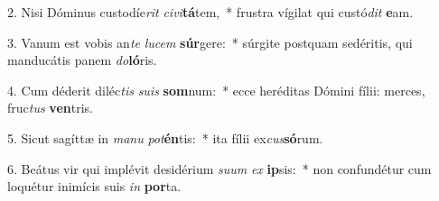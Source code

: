 2. Nisi Dóminus custodíe\textit{rit} \textit{ci}\textit{vi}\textbf{tá}tem,~*  frustra vígilat qui custó\textit{dit} \textbf{e}am.\

3. Vanum est vobis an\textit{te} \textit{lu}\textit{cem} \textbf{súr}gere:~*  súrgite postquam sedéritis, qui manducátis panem \textit{do}\textbf{ló}ris.\

4. Cum déderit diléc\textit{tis} \textit{su}\textit{is} \textbf{som}num:~*  ecce heréditas Dómini fílii: merces, fruc\textit{tus} \textbf{ven}tris.\

5. Sicut sagíttæ in \textit{ma}\textit{nu} \textit{pot}\textbf{én}tis:~*  ita fílii ex\textit{cus}\textbf{só}rum.\

6. Beátus vir qui implévit desidérium \textit{su}\textit{um} \textit{ex} \textbf{ip}sis:~*  non confundétur cum loquétur inimícis suis \textit{in} \textbf{por}ta.\

